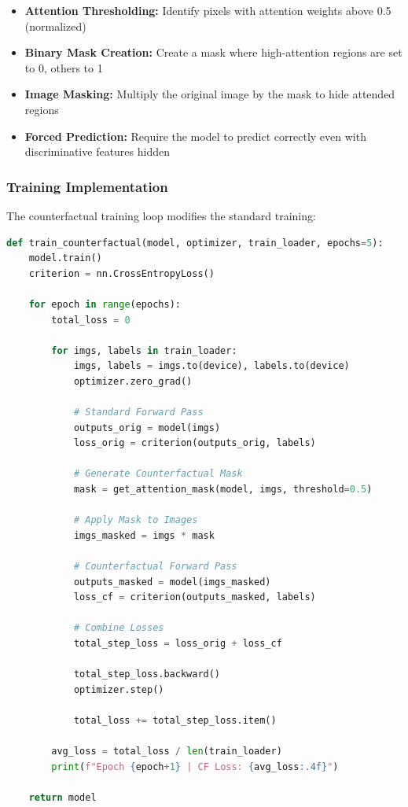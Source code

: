 \documentclass[a4paper,12pt]{article}
\begin{document}
\begin{itemize}
    \item \textbf{Attention Thresholding:} Identify pixels with attention weights above 0.5 (normalized)
    \item \textbf{Binary Mask Creation:} Create a mask where high-attention regions are set to 0, others to 1
    \item \textbf{Image Masking:} Multiply the original image by the mask to hide attended regions
    \item \textbf{Forced Prediction:} Require the model to predict correctly even with discriminative features hidden
\end{itemize}

\subsubsection*{Training Implementation}
The counterfactual training loop modifies the standard training:

\begin{lstlisting}[language=Python, caption=Counterfactual Training Loop]
def train_counterfactual(model, optimizer, train_loader, epochs=5):
    model.train()
    criterion = nn.CrossEntropyLoss()
    
    for epoch in range(epochs):
        total_loss = 0
        
        for imgs, labels in train_loader:
            imgs, labels = imgs.to(device), labels.to(device)
            optimizer.zero_grad()
            
            # Standard Forward Pass
            outputs_orig = model(imgs)
            loss_orig = criterion(outputs_orig, labels)
            
            # Generate Counterfactual Mask
            mask = get_attention_mask(model, imgs, threshold=0.5)
            
            # Apply Mask to Images
            imgs_masked = imgs * mask
            
            # Counterfactual Forward Pass
            outputs_masked = model(imgs_masked)
            loss_cf = criterion(outputs_masked, labels)
            
            # Combine Losses
            total_step_loss = loss_orig + loss_cf
            
            total_step_loss.backward()
            optimizer.step()
            
            total_loss += total_step_loss.item()
            
        avg_loss = total_loss / len(train_loader)
        print(f"Epoch {epoch+1} | CF Loss: {avg_loss:.4f}")
        
    return model
\end{lstlisting}
\end{document}
